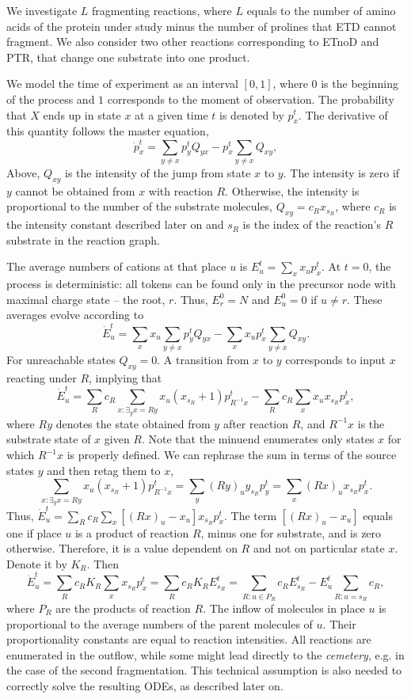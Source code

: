 \documentclass{llncs}
\begin{document}
We investigate $L$ fragmenting reactions, where $L$ equals to the number of amino acids of the protein under study minus the number of prolines that ETD cannot fragment. We also consider two other reactions corresponding to ETnoD and PTR, that change one substrate into one product.

We model the time of experiment as an interval $[0,1]$, where $0$ is the beginning of the process and $1$ corresponds to the moment of observation. The probability that $X$ ends up in state $x$ at a given time $t$ is denoted by $p_x^t$. The derivative of this quantity follows the master equation,
        $$\dot{p}_x^t = \sum_{y\not=x} p_y^t Q_{yx} - p_x^t \sum_{y\not=x} Q_{xy},$$
Above, $Q_{xy}$ is the intensity of the jump from state $x$ to $y$. The intensity is zero if $y$ cannot be obtained from $x$ with reaction $R$. Otherwise, the intensity is proportional to the number of the substrate molecules, $Q_{xy}=c_R x_{s_R}$,  where $c_R$ is the intensity constant described later on and $s_R$ is the index of the reaction's $R$ substrate in the reaction graph.

The average numbers of cations at that place $u$ is $E_u^t= \sum_x x_up_x^t$.
At $t=0$, the process is deterministic: all tokens can be found only in the precursor node with maximal charge state -- the root, $r$.
Thus, $E_r^0=N$ and $E_u^0=0$ if $u \not= r$.
These averages evolve according to
        $$\dot E_u^t=\sum_x x_u \sum_{y\not=x} p_y^t Q_{yx} -\sum_x x_u p_x^t \sum_{y\not=x} Q_{xy}.$$
For unreachable states $Q_{xy} = 0$.
A transition from $x$ to $y$ corresponds to input $x$ reacting under $R$, implying that
        $$\dot E_u^t = \sum_R c_R \sum_{x: \exists_y x=Ry}  x_u (x_{s_R}+1) p_{R^{-1}x}^t- \sum_R c_R \sum_{x} x_u x_{s_R} p_x^t,$$
where $Ry$ denotes the state obtained from $y$ after reaction $R$,
and $R^{-1}x$ is the substrate state of $x$ given $R$.
Note that the minuend enumerates only states $x$ for which $R^{-1}x$ is properly defined.
We can rephrase the sum in terms of the source states $y$ and then retag them to $x$,
        $$\sum_{x:\exists_y x=Ry} x_u (x_{s_R}+1) p_{R^{-1}x}^t = \sum_{y}  (Ry)_u y_{s_R} p_y^t = \sum_x (Rx)_u x_{s_R} p_x^t.$$
Thus, $\dot E_u^t = \sum_R c_R \sum_x   \left[(Rx)_u-x_u \right] x_{s_R} p_x^t$. The term $\left[(Rx)_u-x_u\right]$ equals one if place $u$ is a product of reaction $R$, minus one for substrate, and is zero otherwise.
Therefore, it is a value dependent on $R$ and not on particular state $x$.
Denote it by $K_R$.
Then
        $$\dot E_u^t = \sum_R c_R K_R \sum_x x_{s_R} p_x^t = \sum_R c_R K_R E_{s_R}^t = \sum_{R:u\in P_R} c_R E_{s_R}^t - E_u^t \sum_{R: u=s_R}c_R,$$
where $P_R$ are the products of reaction $R$.
The inflow of molecules in place $u$ is proportional to the average numbers of the parent molecules of $u$.
Their proportionality constants are equal to reaction intensities.
All reactions are enumerated in the outflow, while some might lead directly to the \textit{cemetery}, e.g. in the case of the second fragmentation. This technical assumption is also needed to correctly solve the resulting ODEs, as described later on.
\end{document}
